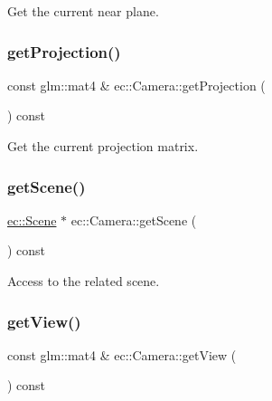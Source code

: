 Get the current near plane. 

\mbox{\label{classec_1_1_camera_a5c245ceac5e710447b88a26a66dcc348}} 
\subsubsection{\texorpdfstring{get\+Projection()}{getProjection()}}
{\footnotesize\ttfamily const glm\+::mat4 \& ec\+::\+Camera\+::get\+Projection (\begin{DoxyParamCaption}{ }\end{DoxyParamCaption}) const}



Get the current projection matrix. 

\mbox{\label{classec_1_1_camera_a33ad8a16eff39b34db86c6dbf2bbabe4}} 
\subsubsection{\texorpdfstring{get\+Scene()}{getScene()}}
{\footnotesize\ttfamily \mbox{\hyperlink{classec_1_1_scene}{ec\+::\+Scene}} $\ast$ ec\+::\+Camera\+::get\+Scene (\begin{DoxyParamCaption}{ }\end{DoxyParamCaption}) const}



Access to the related scene. 

\mbox{\label{classec_1_1_camera_aa273a9bbe51bc00e8b0a35d8c79b0766}} 
\subsubsection{\texorpdfstring{get\+View()}{getView()}}
{\footnotesize\ttfamily const glm\+::mat4 \& ec\+::\+Camera\+::get\+View (\begin{DoxyParamCaption}{ }\end{DoxyParamCaption}) const}



